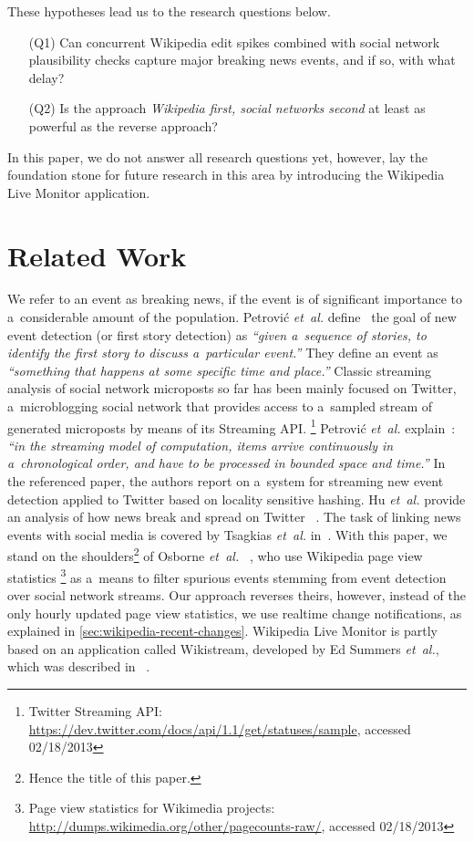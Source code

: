 \documentclass{sig-alternate}
\newcommand{\inlinelistingsize}{\fontsize{8pt}{11pt}}
\let\oldurl\url
\renewcommand{\url}[1]{\inlinelistingsize\oldurl{#1}}
\begin{document}
\noindent These hypotheses lead us to the research questions below.

\begin{itemize}
  \itemsep0em
  \item[(Q1)] Can concurrent Wikipedia edit spikes combined with
    social network plausibility checks capture major breaking news events,
    and if so, with what delay?
  \item[(Q2)] Is the approach \emph{Wikipedia first, social networks second}
    at least as powerful as the reverse approach?
\end{itemize}

In this paper, we do not answer all research questions yet,
however, lay the foundation stone for future research in this area
by introducing the Wikipedia Live Monitor application.

\section{Related Work}

We refer to an event as breaking news, if the event is of significant importance
to a~considerable amount of the population.
Petrovi\'{c} \emph{et~al.} define~\cite{petrovic2010streamingfirststory}
the goal of new event detection (or first story detection) as
\textit{``given a~sequence of stories, to identify the first story
to discuss a~particular event.''}
They define an event as \textit{``something that happens
at some specific time and place.''}
Classic streaming analysis of social network microposts so far has been mainly
focused on Twitter, a~microblogging social network that provides access
to a~sampled stream of generated microposts by means of its Streaming API.%
\footnote{Twitter Streaming API: \url{https://dev.twitter.com/docs/api/1.1/get/statuses/sample},
accessed 02/18/2013}
Petrovi\'{c} \emph{et~al.} explain~\cite{petrovic2010streamingfirststory}:
\textit{``in the streaming model of computation,
items arrive continuously in a~chronological order, and have to be
processed in bounded space and time.''}
In the referenced paper, the authors report on a~system for streaming
new event detection applied to Twitter based on locality sensitive hashing.
Hu \emph{et~al.} provide an analysis of how news break and spread on Twitter~%
\cite{hu2012breakingnews}.
The task of linking news events with social media is covered by Tsagkias
\emph{et~al.} in~\cite{tsagkias2011linkingonlinenews}.
With this paper, we stand on the shoulders\footnote{Hence the title of this paper.}
of Osborne \emph{et~al.}~%
\cite{osborne2012bieber}, who use Wikipedia page view statistics%
\footnote{Page view statistics for Wikimedia projects: \url{http://dumps.wikimedia.org/other/pagecounts-raw/},
accessed 02/18/2013}
as a~means to filter spurious events
stemming from event detection over social network streams.
Our approach reverses theirs, however, instead of the only hourly updated
page view statistics, we use realtime change notifications,
as explained in \autoref{sec:wikipedia-recent-changes}.
Wikipedia Live Monitor is partly based on an application called
Wikistream, developed by Ed Summers \emph{et~al.}, which was described in~%
\cite{summers2011odetonode}.
\end{document}
